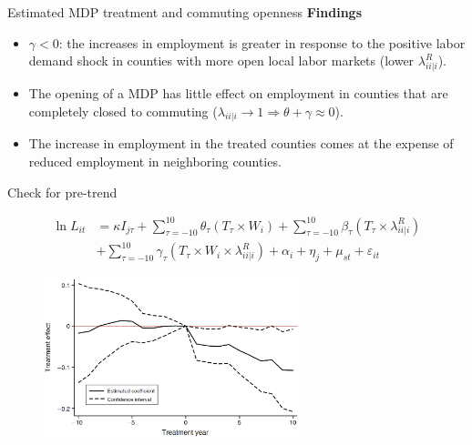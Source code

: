 \documentclass{beamer}
\begin{document}
\begin{frame}{Estimated MDP treatment and commuting openness}
	\textbf{Findings}
	\begin{itemize}
		\item $\gamma < 0$: the increases in employment is greater in response to the positive labor demand shock in counties with more open local labor markets (lower $\lambda_{ii|i}^R$).
		\item The opening of a MDP has little effect on employment in counties that are completely closed to commuting ($\lambda_{ii|i}\to 1 \Rightarrow \theta+\gamma\approx 0$).
		\item The increase in employment in the treated counties comes at the expense of reduced employment in neighboring counties.
	\end{itemize}
\end{frame}
\begin{frame}{Check for pre-trend}
	\begin{small}
		\begin{equation}
			\begin{aligned}
				\ln L_{it} &= \kappa I_{j\tau} + \sum_{\tau=-10}^{10}\theta_{\tau}(T_{\tau}\times W_i) + \sum_{\tau=-10}^{10}\beta_\tau(T_{\tau}\times \lambda_{ii|i}^R) \\
				&+ \sum_{\tau=-10}^{10}\gamma_\tau(T_{\tau}\times W_i\times \lambda_{ii|i}^R) + \alpha_i + \eta_j + \mu_{st} + \varepsilon_{it}
			\end{aligned}
		\end{equation}
	\end{small}
	\begin{figure}[htbp]
		\centering
		\includegraphics[width=0.66\textwidth]{fig5.png}
	\end{figure}
\end{frame}
\end{document}
